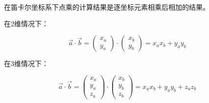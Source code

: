 \documentclass[openany]{progbookcn}
\begin{document}
在笛卡尔坐标系下点乘的计算结果是逐坐标元素相乘后相加的结果。

在2维情况下：

\begin{equation}
	\overrightarrow{a} \cdot \overrightarrow{b} = \begin{pmatrix}
		x_a\\ 
		y_a
	\end{pmatrix}\cdot
	\begin{pmatrix}
		x_b\\ 
		y_b
	\end{pmatrix}
	=x_ax_b+y_ay_b
\end{equation}

在3维情况下：

\begin{equation}
	\overrightarrow{a} \cdot \overrightarrow{b} = \begin{pmatrix}
		x_a\\ 
		y_a\\
		z_a
	\end{pmatrix}\cdot
	\begin{pmatrix}
		x_b\\ 
		y_b\\
		z_b
	\end{pmatrix}
	=x_ax_b+y_ay_b+z_az_b 
\end{equation}
\end{document}
